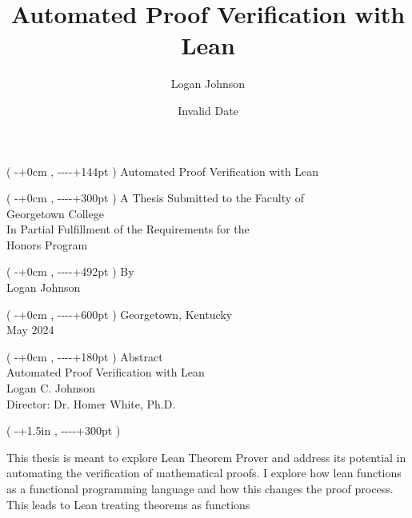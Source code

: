 \documentclass[
  letterpaper,
]{scrreprt}
\title{Automated Proof Verification with Lean}
\author{Logan Johnson}
\date{Invalid Date}
\theoremstyle{remark}
\begin{document}
\newcommand{\fromtop}[1]{%
  \dimexpr-1in-\topskip-\topmargin-\headheight-\headsep+#1\relax
}
\newcommand{\fromleft}[1]{%
  \dimexpr-1in-\oddsidemargin+#1\relax
}
\setlength{\textwidth}{6in}
\begin{titlepage}
\cleardoublepage
\thispagestyle{empty}
\begin{textblock*}{\paperwidth}(\fromleft{0cm},\fromtop{144pt})
\centering
Automated Proof Verification with Lean
\end{textblock*}
\begin{textblock*}{\paperwidth}(\fromleft{0cm},\fromtop{300pt})
\centering
A Thesis Submitted to the Faculty of\\
\vspace{12pt}
Georgetown College\\
\vspace{12pt}
In Partial Fulfillment of the Requirements for the\\
\vspace{12pt}
Honors Program
\end{textblock*}
\begin{textblock*}{\paperwidth}(\fromleft{0cm},\fromtop{492pt})
\centering
By\\
\vspace{12pt}
Logan Johnson
\end{textblock*}
\begin{textblock*}{\paperwidth}(\fromleft{0cm},\fromtop{600pt})
\centering
Georgetown, Kentucky\\
\vspace{12pt}
May 2024
\end{textblock*}
\pagebreak
\thispagestyle{empty}
\begin{textblock*}{\paperwidth}(\fromleft{0cm},\fromtop{180pt})
\centering
Abstract\\
\vspace{12pt}
Automated Proof Verification with Lean\\
\vspace{12pt}
Logan C. Johnson\\
\vspace{12pt}
Director: Dr. Homer White, Ph.D.
\end{textblock*}
\begin{textblock*}{\textwidth}(\fromleft{1.5in},\fromtop{300pt})
\raggedright
This thesis is meant to explore Lean Theorem Prover and address its potential in automating the 
verification of mathematical proofs. I explore how lean functions as a functional programming 
language and how this changes the proof process. This leads to Lean treating theorems as functions 

\end{textblock*}
\end{titlepage}
\end{document}
